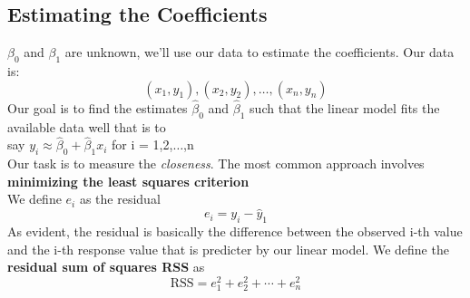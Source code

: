 \documentclass{article}
\begin{document}
\subsection*{Estimating the Coefficients} 
$\beta_0$ and $\beta_1$ are unknown, we'll use our data to estimate the coefficients. Our data is:\\
\begin{equation*} (x_1,y_1),(x_2,y_2),\dots,(x_n,y_n) \end{equation*} 
Our goal is to find the estimates $\hat{\beta}_0$ and $\hat{\beta}_1$ such that the linear model fits the available data well that is to \\[2pt] say $y_i \approx \hat{\beta}_0 + \hat{\beta}_1 x_i$ for i = 1,2,$\dots$,n 
\\ Our task is to measure the \textit{closeness}. The most common approach involves \textbf{minimizing the least squares criterion} 
\\
We define $e_i$ as the residual \begin{equation*} e_i = y_i - \hat{y}_1 \end{equation*}
As evident, the residual is basically the difference between the observed i-th value and the i-th response value that is predicter by our linear model. We define the \textbf{residual sum of squares RSS} as 
\begin{equation*} \text{RSS} = e_1^{2} + e_2^{2} + \cdots + e_n^{2} \end{equation*}
\end{document}
